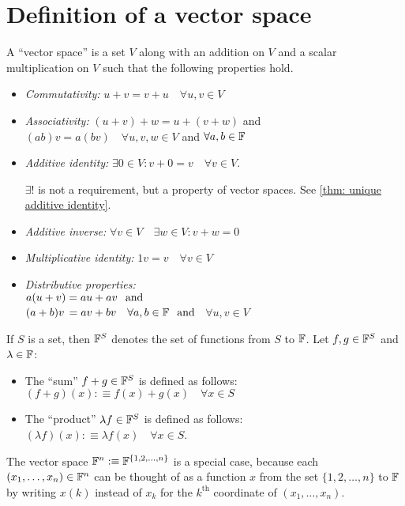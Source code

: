 \section{Definition of a vector space}

\setcounter{thm}{19}
\begin{mydef} 
  A ``vector space'' is a set $V$ along with an addition on $V$ and a scalar multiplication on $V$ such that the following properties hold. 
  \begin{itemize}
    \item \emph{Commutativity:}
    $ u+v = v+u \quad \forall u,v \in V$
    \item \emph{Associativity:}
    $(u+v)+w=u+(v+w)$ and $(ab)v=a(bv) \quad \forall u,v,w \in V$ and $\forall a,b \in \mathbb{F}$
    \item \emph{Additive identity:}
    $\exists 0\in V:v+0=v \quad \forall v\in V$. 
    
    $\exists!$ is not a requirement, but a property of vector spaces. See \ref{thm: unique additive identity}.
    \item \emph{Additive inverse:}
    $\forall v\in V \quad \exists w\in V: v+w=0$
    \item \emph{Multiplicative identity:}
    $1v = v \quad \forall v\in V$
    \item \emph{Distributive properties:}\\
    $a(u+v) = au+av \;\;\, \text{and}\;\;$  \\
    $(a+b)v \, = av + bv \quad \forall a,b \in \mathbb{F} \;\;\, \text{and}\;\;$
    $\forall u,v \in V$
  \end{itemize}
\end{mydef}

\setcounter{thm}{23}
\begin{mydef} 
  If $S$ is a set, then $\mathbb{F}^S$ denotes the set of functions from $S$ to $\mathbb{F}$. Let $f, g \in \mathbb{F}^{S}$ and $\lambda \in \mathbb{F}$:
  \begin{itemize}
    \item The ``sum'' $f+g \in \mathbb{F}^{S}$ is defined as follows: $(f+g)(x) :\equiv f(x)+ g(x) \quad \forall x\in S$
    \item The ``product'' $\lambda f \in \mathbb{F}^{S}$ is defined as follows: $(\lambda f)(x) :\equiv \lambda f(x) \quad \forall x \in S$.
  \end{itemize}
  The vector space $\mathbb{F}^{n} :\equiv \mathbb{F}^{\{1,2,\dots,n\}}$ is a special case, because each $(x_1, \dots, x_n) \in \mathbb{F}^{n}$ can be thought of as a function $x$ from the set $\{1, 2, \dots, n\}$ to $\mathbb{F}$ by writing $x(k)$ instead of $x_k$ for the $k^{\text{th}}$ coordinate of $(x_1, \dots, x_n)$.
\end{mydef}

